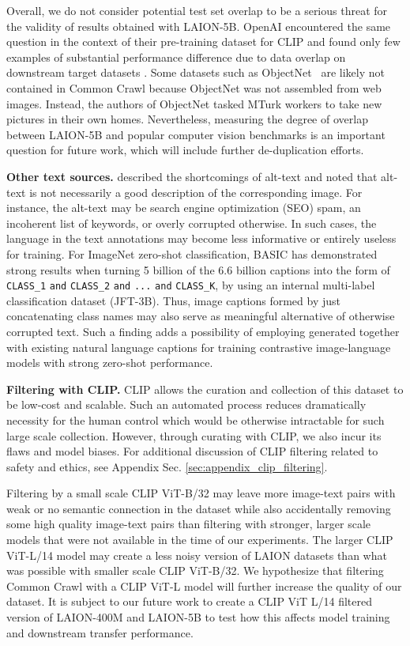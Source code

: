 Overall, we do not consider potential test set overlap to be a serious threat for the validity of results obtained with LAION-5B. OpenAI encountered the same question in the context of their pre-training dataset for CLIP and found only few examples of substantial performance difference due to data overlap on downstream target datasets \citep{radford2021learning}. Some datasets such as ObjectNet~\cite{objectnet} are likely not contained in Common Crawl because ObjectNet was not assembled from web images. Instead, the authors of ObjectNet tasked MTurk workers to take new pictures in their own homes. Nevertheless, measuring the degree of overlap between LAION-5B and popular computer vision benchmarks is an important question for future work, which will include further de-duplication efforts.

\textbf{Other text sources.}
\citet{birhane2021multimodal} described the shortcomings of alt-text and noted that alt-text is not necessarily a good description of the corresponding image. For instance, the alt-text may be search engine optimization (SEO) spam, an incoherent list of keywords, or overly corrupted otherwise. In such cases, the language in the text annotations may become less informative or entirely useless for training. For ImageNet zero-shot classification,  BASIC \citep{basic} has demonstrated strong results when turning 5 billion of the 6.6 billion captions into the form of \texttt{CLASS\_1} \texttt{and} \texttt{CLASS\_2} \texttt{and}
 \texttt{...} \texttt{and} \texttt{CLASS\_K}, by using an internal multi-label classification dataset (JFT-3B). Thus, image captions formed by just concatenating class names may also serve as meaningful alternative of otherwise corrupted text. Such a finding adds a possibility of employing generated together with existing natural language captions for training contrastive image-language models with strong zero-shot performance.

\textbf{Filtering with CLIP.} CLIP allows the curation and collection of this dataset to be low-cost and scalable. Such an automated process reduces dramatically necessity for the human control which would be otherwise intractable for such large scale collection. However, through curating with CLIP, we also incur its flaws and model biases. For additional discussion of CLIP filtering related to safety and ethics, see Appendix Sec. \ref{sec:appendix_clip_filtering}.

Filtering by a small scale CLIP ViT-B/32 may leave more image-text pairs with weak or no semantic connection in the dataset while also accidentally removing some high quality image-text pairs than filtering with stronger, larger scale models that were not available in the time of our experiments. The larger CLIP ViT-L/14 model may create a less noisy version of LAION datasets than what was possible with smaller scale CLIP ViT-B/32. We hypothesize that filtering Common Crawl with a CLIP ViT-L model will further increase the quality of our dataset. It is subject to our future work to create a CLIP ViT L/14 filtered version of LAION-400M and LAION-5B to test how this affects model training and downstream transfer performance. 

